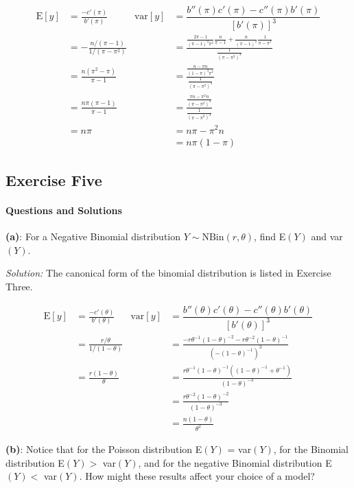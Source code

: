 \documentclass[]{article}
\let\oldparagraph\paragraph
\renewcommand{\paragraph}[1]{\oldparagraph{#1}\mbox{}}
\begin{document}
\begin{align*}
\text{E}[y] &= \frac{-c'(\pi)}{b'(\pi)} & \text{var}[y] &= \dfrac{b''(\pi)c'(\pi) - c''(\pi)b'(\pi)}{[b'(\pi)]^3}\\
&= -\frac{n/(\pi-1)}{1/(\pi - \pi^2)} & &= \frac{\frac{2\pi - 1}{(\pi-1)^2\pi^2}\frac{n}{\pi-1} + \frac{n}{(\pi-1)^2}\frac{1}{\pi-\pi^2}}{\frac{1}{(\pi - \pi^2)^3}}\\
&=  \frac{n(\pi^2 - \pi)}{\pi-1}      & &= \frac{\frac{n - \pi n}{(1 - \pi)^3\pi^2}}{\frac{1}{(\pi - \pi^2)^3}}\\
&= \frac{n\pi(\pi-1)}{\pi - 1}        & &= \frac{\frac{\pi n - \pi^2 n}{(\pi - \pi^2)^3}}{\frac{1}{(\pi - \pi^2)^3}}\\
&= n\pi                               & &= n\pi - \pi^2n\\
& & &= n\pi(1-\pi)
\end{align*}

\subsection{Exercise Five}\label{exercise-five}

\paragraph{Questions and Solutions}\label{questions-and-solutions}

\textbf{(a)}: For a Negative Binomial distribution
\(Y \sim \text{NBin}(r, \theta)\), find E\((Y)\) and var\((Y)\).

\emph{Solution: } The canonical form of the binomial distribution is
listed in Exercise Three.

\begin{align*}
\text{E}[y] &= \frac{-c'(\theta)}{b'(\theta)} & \text{var}[y] &= \dfrac{b''(\theta)c'(\theta) - c''(\theta)b'(\theta)}{[b'(\theta)]^3}\\
&= \frac{r/\theta}{1/(1-\theta)} & &= \frac{-r\theta^{-1}(1-\theta)^{-2} - r\theta^{-2}(1-\theta)^{-1}}{(-(1-\theta)^{-1})^3}\\
&= \frac{r(1-\theta)}{\theta} & &= \frac{r\theta^{-1}(1-\theta)^{-1}((1-\theta)^{-1} + \theta^{-1})}{(1-\theta)^{-3}}\\
& & &= \frac{r\theta^{-2}(1-\theta)^{-2}}{(1-\theta)^{-3}}\\
& & &= \frac{n(1-\theta)}{\theta^2}
\end{align*}

\textbf{(b)}: Notice that for the Poisson distribution E\((Y)\) =
var\((Y)\), for the Binomial distribution E\((Y) >\) var\((Y)\), and for
the negative Binomial distribution E\((Y) <\) var\((Y)\). How might
these results affect your choice of a model?
\end{document}
